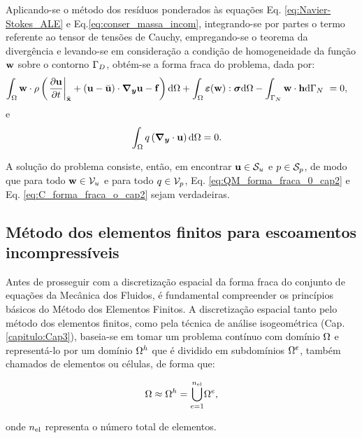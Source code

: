 \documentclass[tese_patricia]{subfiles}%
\begin{document}
Aplicando-se o método dos resíduos ponderados às equações Eq. \eqref{eq:Navier-Stokes_ALE} e Eq.\eqref{eq:conser_massa_incom}, integrando-se por partes o termo referente ao tensor de tensões de Cauchy, empregando-se o teorema da divergência e levando-se em consideração a condição de homogeneidade da função $\mathbf{w}$ sobre o contorno $\Gamma_{D}$, obtém-se a forma fraca do problema, dada por:
\begin{align}
\int_{\Omega} \mathbf{w} \cdot \rho  \left(\left . \frac{\partial\mathbf{u}}{\partial t} \right|_{\bar{\mathbf{x}}} + \left(\mathbf{u} - \bar{\mathbf{u}} \right)\cdot\boldsymbol{\nabla_y} \mathbf{u} - \mathbf{f} \right) \mathrm{d} \Omega + \int_{\Omega} \bm{\varepsilon}(\mathbf{w}) : \boldsymbol{\sigma}  \mathrm{d} \Omega - \int_{\Gamma_{N}} \mathbf{w} \cdot \mathbf{h} \mathrm{d}\Gamma_{N}  \  &= 0,  \label{eq:QM_forma_fraca_0_cap2} 
\end{align}
e
\begin{align}
\int_{\Omega} q \left(\boldsymbol{\nabla_y} \cdot \mathbf{u}\right) \mathrm{d} \Omega &= 0. \label{eq:C_forma_fraca_0_cap2} 
\end{align}

A solução do problema consiste, então, em encontrar $\mathbf{u} \in \mathcal{S}_u$ e $p \in \mathcal{S}_p$, de modo que para todo $\mathbf{w} \in \mathcal{V}_u$ e para todo $q \in \mathcal{V}_p$, Eq. \eqref{eq:QM_forma_fraca_0_cap2} e Eq. \eqref{eq:C_forma_fraca_o_cap2} sejam verdadeiras.


\subsection{Método dos elementos finitos para escoamentos incompressíveis}

Antes de prosseguir com a discretização espacial da forma fraca do conjunto de equações da Mecânica dos Fluidos, é fundamental compreender os princípios básicos do Método dos Elementos Finitos.  A discretização espacial tanto pelo método dos elementos finitos, como pela técnica de análise isogeométrica (Cap. \ref{capitulo:Cap3}), baseia-se em tomar um problema contínuo com domínio $\Omega$ e representá-lo por um domínio $\Omega^h$ que é dividido em subdomínios $\Omega^e$, também chamados de elementos ou células, de forma que:

\begin{align}
	\Omega \approx \Omega^h = {\bigcup_{e = 1}^{n_{\mathrm{el}}}} \Omega^e,
\end{align}

\noindent onde $n_{\mathrm{el}}$ representa o número total de elementos.
\end{document}
